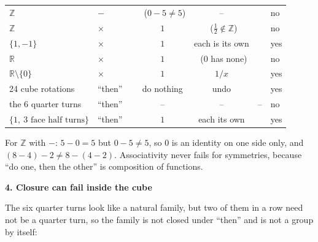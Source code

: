 \documentclass[10pt]{article}
\newcommand{\cmark}{\textcolor{why}{\ding{51}}}\newcommand{\xmark}{\textcolor{pit}{\ding{55}}}\usepackage{pifont}
\newcommand{\Z}{\mathbb{Z}}
\newcommand{\R}{\mathbb{R}}
\begin{document}
{\begin{minipage}[t]{744pt}
\begin{minipage}[t]{372pt}
\begin{tabular}{@{}llccccl@{}}
$\Z$ & $-$ & \cmark & \xmark\ ($0-5\neq5$) & -- & \xmark & no\\
$\Z$ & $\times$ & \cmark & $1$ & \xmark\ ($\tfrac12\notin\Z$) & \cmark & no\\
$\{1,-1\}$ & $\times$ & \cmark & $1$ & each is its own & \cmark & yes\\
$\R$ & $\times$ & \cmark & $1$ & \xmark\ ($0$ has none) & \cmark & no\\
$\R\setminus\{0\}$ & $\times$ & \cmark & $1$ & $1/x$ & \cmark & yes\\
24 cube rotations & ``then'' & \cmark & do nothing & undo & \cmark & yes\\
the 6 quarter turns & ``then'' & \xmark & -- & -- & -- & no\\
$\{1,\ \text{3 face half turns}\}$ & ``then'' & \cmark & $1$ & each its own & \cmark & yes\\
\bottomrule
\end{tabular}\par\vspace{3pt}
\raggedright
For $\Z$ with $-$: $5-0=5$ but $0-5\neq5$, so $0$ is an identity on one side only, and $(8-4)-2\neq8-(4-2)$. Associativity never fails for symmetries, because ``do one, then the other'' is composition of functions.\par\vspace{6pt}
{\sffamily\bfseries\color{big} 4. Closure can fail inside the cube}\par\vspace{3pt}
The six quarter turns look like a natural family, but two of them in a row need not be a quarter turn, so the family is not closed under ``then'' and is not a group by itself:\par\vspace{2pt}
\centering
{}
\end{minipage}
\end{minipage}}
\end{document}
